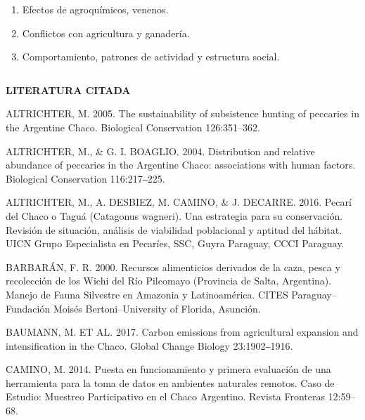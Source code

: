 \documentclass[
  x11names]{article}
\begin{document}
\begin{enumerate}
\def\labelenumi{\arabic{enumi}.}
\setcounter{enumi}{12}
\item
  Efectos de agroquímicos, venenos.
\item
  Conflictos con agricultura y ganadería.
\item
  Comportamiento, patrones de actividad y estructura social.
\end{enumerate}


%
\begin{table}[H]
\centering
\begin{tabular}[t]{>{\raggedright\arraybackslash}m{16cm}>{}m{16cm}}
\toprule
\cellcolor{ceil}{\textcolor{white}{\textbf{\rule{0pt}{14pt}BIBLIOGRAFÍA}}}\\
\bottomrule
\end{tabular}
\end{table}

\vspace{-0.4cm}

\setlength{\parindent}{20pt}\noindent\textbf{LITERATURA CITADA}

ALTRICHTER, M. 2005. The sustainability of subsistence hunting of
peccaries in the Argentine Chaco. Biological Conservation 126:351--362.

ALTRICHTER, M., \& G. I. BOAGLIO. 2004. Distribution and relative
abundance of peccaries in the Argentine Chaco: associations with human
factors. Biological Conservation 116:217‒225.

ALTRICHTER, M., A. DESBIEZ, M. CAMINO, \& J. DECARRE. 2016. Pecarí del
Chaco o Taguá (Catagonus wagneri). Una estrategia para su conservación.
Revisión de situación, análisis de viabilidad poblacional y aptitud del
hábitat. UICN Grupo Especialista en Pecaríes, SSC, Guyra Paraguay, CCCI
Paraguay.

BARBARÁN, F. R. 2000. Recursos alimenticios derivados de la caza, pesca
y recolección de los Wichi del Río Pilcomayo (Provincia de Salta,
Argentina). Manejo de Fauna Silvestre en Amazonia y Latinoamérica. CITES
Paraguay--Fundación Moisés Bertoni--University of Florida, Asunción.

BAUMANN, M. ET AL. 2017. Carbon emissions from agricultural expansion
and intensification in the Chaco. Global Change Biology 23:1902‒1916.

CAMINO, M. 2014. Puesta en funcionamiento y primera evaluación de una
herramienta para la toma de datos en ambientes naturales remotos. Caso
de Estudio: Muestreo Participativo en el Chaco Argentino. Revista
Fronteras 12:59--68.
\end{document}
